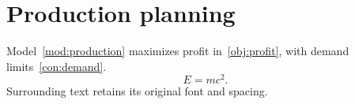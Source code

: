 \documentclass{article}
\begin{document}
\section*{Production planning}
\begin{orsets}
\end{orsets}
\begin{orparameters}
\end{orparameters}
\begin{orvariables}
\end{orvariables}
\begin{ormodel}[title={Production model},label=mod:production]
\end{ormodel}
Model~\eqref{mod:production} maximizes profit in~\eqref{obj:profit},
with demand limits~\eqref{con:demand}.
\begin{equation} E=mc^2. \end{equation}
Surrounding text retains its original font and spacing.
\end{document}
